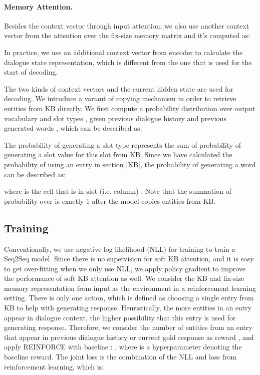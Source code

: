 \documentclass[11pt]{article}
\begin{document}
\paragraph{Memory Attention.}
Besides the context vector through input attention, we also use another context vector from the attention over the fix-size memory matrix  and it's computed as:

In practice, we use an additional context vector from encoder to calculate the dialogue state representation, which is different from the one that is used for the start of decoding.

The two kinds of context vectors and the current hidden state are used for decoding. 
We introduce a variant of copying mechanism \cite{gu:2016:ACL} in order to retrieve entities from KB directly. We first compute a probability distribution over output vocabulary  and slot types , given previous dialogue history  and previous generated words , which can be described as:

The probability of generating a slot type represents the sum of probability of generating a slot value for this slot from KB. Since we have calculated the probability of using an entry in section \ref{KB}, the probability of generating a word can be described as:

where  is the cell that is in slot (i.e. column) .
Note that the summation of probability over  is exactly 1 after the model copies entities from KB.


\subsection{Training}
Conventionally, we use negative log likelihood (NLL) for training to train a Seq2Seq model. 
Since there is no supervision for soft KB attention, and it is easy to get over-fitting when we only use NLL,  we apply policy gradient to improve the performance of soft KB attention as well. We consider the KB and fix-size memory representation from input as the environment in a reinforcement learning setting. There is only one action, which is defined as choosing a single entry from KB to help with generating response. Heuristically, the more entities in an entry appear in dialogue context, the higher possibility that this entry is used for generating response. Therefore, we consider the number of entities from an entry  that appear in previous dialogue history or current gold response as reward , and apply REINFORCE with baseline \cite{williams:1992:RL}:
,
where  is a hyperparameter denoting the baseline reward. The joint loss is the combination of the NLL and loss from reinforcement learning, which is:
\end{document}
